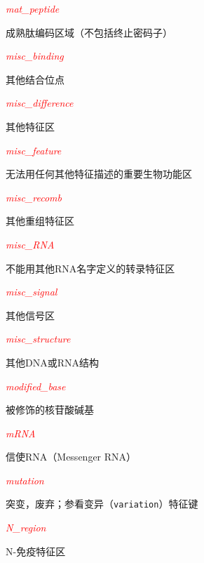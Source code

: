 \textcolor{red}{\textit{mat\_peptide}}
\begin{adjustwidth}{4em}{}
成熟肽编码区域（不包括终止密码子）
\end{adjustwidth}

\textcolor{red}{\textit{misc\_binding}}
\begin{adjustwidth}{4em}{}
其他结合位点
\end{adjustwidth}

\textcolor{red}{\textit{misc\_difference}}
\begin{adjustwidth}{4em}{}
其他特征区
\end{adjustwidth}

\textcolor{red}{\textit{misc\_feature}}
\begin{adjustwidth}{4em}{}
无法用任何其他特征描述的重要生物功能区
\end{adjustwidth}

\textcolor{red}{\textit{misc\_recomb}}
\begin{adjustwidth}{4em}{}
其他重组特征区
\end{adjustwidth}

\textcolor{red}{\textit{misc\_RNA}}
\begin{adjustwidth}{4em}{}
不能用其他RNA名字定义的转录特征区
\end{adjustwidth}

\textcolor{red}{\textit{misc\_signal}}
\begin{adjustwidth}{4em}{}
其他信号区
\end{adjustwidth}

\textcolor{red}{\textit{misc\_structure}}
\begin{adjustwidth}{4em}{}
其他DNA或RNA结构
\end{adjustwidth}

\textcolor{red}{\textit{modified\_base}}
\begin{adjustwidth}{4em}{}
被修饰的核苷酸碱基
\end{adjustwidth}

\textcolor{red}{\textit{mRNA}}
\begin{adjustwidth}{4em}{}
信使RNA（Messenger RNA）
\end{adjustwidth}

\textcolor{red}{\textit{mutation}}
\begin{adjustwidth}{4em}{}
突变，废弃；参看变异（\verb|variation|）特征键
\end{adjustwidth}

\textcolor{red}{\textit{N\_region}}
\begin{adjustwidth}{4em}{}
N-免疫特征区
\end{adjustwidth}

